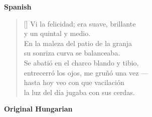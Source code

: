 \documentclass[a4paper,12pt,twoside,final]{book}
\begin{document}
\bigskip

\noindent \textbf{Spanish}


\settowidth{\versewidth}{entrecerró los ojos, me gruñó una vez ---}

\begin{verse}[\versewidth]
  Vi la felicidad; era suave, brillante \\
  y un quintal y medio. \\
  En la maleza del patio de la granja \\
  su sonriza curva se balanceaba. \\
  Se abatió en el charco blando y tibio, \\
  entrecerró los ojos, me gruñó una vez --- \\
  hasta hoy veo con que vacilación \\
  la luz del día jugaba con sus cerdas. \\
\end{verse}

\newpage


\noindent \textbf{Original Hungarian}



\settowidth{\versewidth}{hunyorgott, röffent még felém ---}
\end{document}
